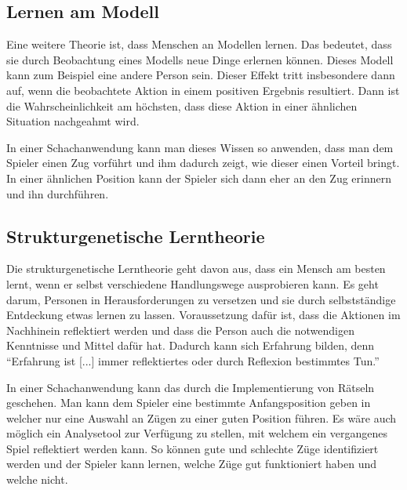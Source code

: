 \subsection{Lernen am Modell}
Eine weitere Theorie ist, dass Menschen an Modellen lernen. Das bedeutet, dass sie durch Beobachtung eines Modells neue Dinge erlernen können. Dieses Modell kann zum Beispiel eine andere Person sein.
Dieser Effekt tritt insbesondere dann auf, wenn die beobachtete Aktion in einem positiven Ergebnis resultiert. Dann ist die Wahrscheinlichkeit am höchsten, dass diese Aktion in einer ähnlichen Situation nachgeahmt wird.
\cite{kron_grundwissen_2024}

In einer Schachanwendung kann man dieses Wissen so anwenden, dass man dem Spieler einen Zug vorführt und ihm dadurch zeigt,
wie dieser einen Vorteil bringt.
In einer ähnlichen Position kann der Spieler sich dann eher an den Zug erinnern und ihn durchführen.

\subsection{Strukturgenetische Lerntheorie}
Die strukturgenetische Lerntheorie geht davon aus, dass ein Mensch am besten lernt, wenn er selbst verschiedene Handlungswege ausprobieren kann. Es geht darum, Personen in Herausforderungen zu versetzen und sie durch selbstständige Entdeckung etwas lernen zu lassen. Voraussetzung dafür ist, dass die Aktionen im Nachhinein reflektiert werden und dass die Person auch die notwendigen Kenntnisse und Mittel dafür hat. Dadurch kann sich Erfahrung bilden, denn \enquote{Erfahrung ist [...] immer reflektiertes oder durch Reflexion bestimmtes Tun.}\cite{kron_grundwissen_2024}

In einer Schachanwendung kann das durch die Implementierung von Rätseln geschehen. Man kann dem Spieler eine bestimmte Anfangsposition geben in welcher nur eine Auswahl an Zügen zu einer guten Position führen. Es wäre auch möglich ein Analysetool zur Verfügung zu stellen, mit welchem ein vergangenes Spiel reflektiert werden kann. So können gute und schlechte Züge identifiziert werden und der Spieler kann lernen, welche Züge gut funktioniert haben und welche nicht.

